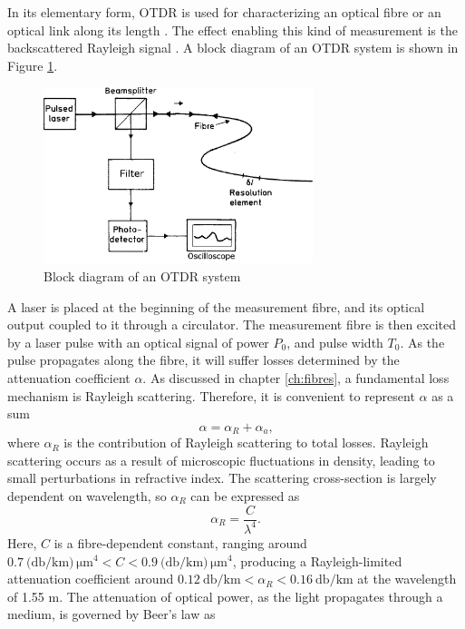 \documentclass{standalone}
\begin{document}
In its elementary form, OTDR is used for characterizing an optical fibre or an optical link along its length \cite{UnderstandingOTDRs2000}. The effect enabling this kind of measurement is the backscattered Rayleigh signal \cite{epflBookRayleigh}. A block diagram of an OTDR system is shown in Figure \ref{fig:otdr_block}.
\begin{figure}[h]
	\centering
	\includegraphics[width=0.7\textwidth]{otdr_block.png}
	\caption{Block diagram of an OTDR system \cite{Rogers1999}}
	\label{fig:otdr_block}
\end{figure}
A laser is placed at the beginning of the measurement fibre, and its optical output coupled to it through a circulator. The measurement fibre is then excited by a laser pulse with an optical signal of power $P_0$, and pulse width $T_0$. As the pulse propagates along the fibre, it will suffer losses determined by the attenuation coefficient $\alpha$. As discussed in chapter \ref{ch:fibres}, a fundamental loss mechanism is Rayleigh scattering. Therefore, it is convenient to represent $\alpha$ as a sum \cite{agrawal}
\begin{equation}
\alpha = \alpha_R + \alpha_a \textrm{,}
\end{equation}
where $\alpha_R$ is the contribution of Rayleigh scattering to total losses. Rayleigh scattering occurs as a result of microscopic fluctuations in density, leading to small perturbations in refractive index. The scattering cross-section is largely dependent on wavelength, so $\alpha_R$ can be expressed as
\begin{equation}
\alpha_R = \frac{C}{\lambda^4} \textrm{.}
\end{equation}
Here, $C$ is a fibre-dependent constant, ranging around $\SI{0.7}{(\decibel / \kilo \meter) \, \micro \meter ^4} < C < \SI{0.9}{(\decibel / \kilo \meter) \, \micro \meter ^4}$, producing a Rayleigh-limited attenuation coefficient around $\SI{0.12}{\decibel / \kilo \meter} < \alpha_R < \SI{0.16}{\decibel / \kilo \meter}$ at the wavelength of 1.55 \textmu m. The attenuation of optical power, as the light propagates through a medium, is governed by Beer's law as
\end{document}

